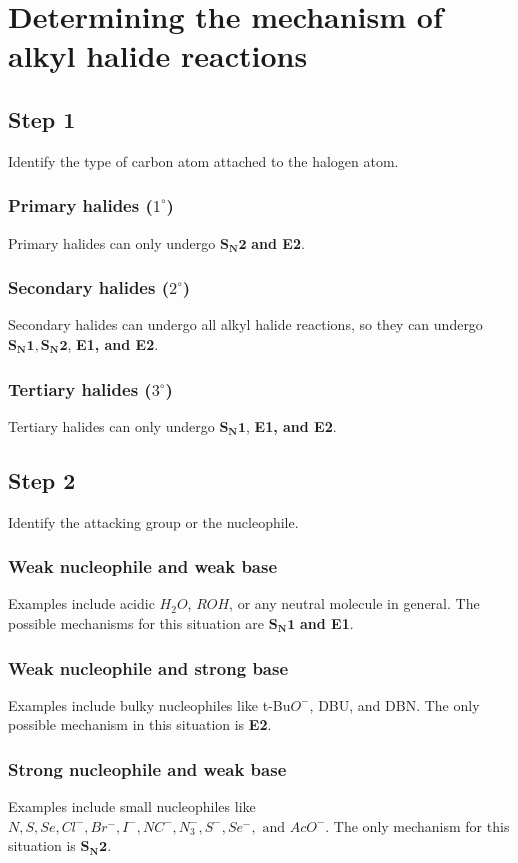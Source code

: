 \documentclass[11pt]{article}
\begin{document}
\newpage
\section{Determining the mechanism of alkyl halide reactions}
\label{sec:orge17bf5c}

\subsection{Step 1}
\label{sec:orgf35dc23}
Identify the type of carbon atom attached to the halogen atom.
\subsubsection{Primary halides (\(1^{\circ}\))}
\label{sec:orge9f49a9}
Primary halides can only undergo \(\boldsymbol{S_N 2}\) \textbf{and E2}.
\subsubsection{Secondary halides (\(2^{\circ}\))}
\label{sec:orga2431b0}
Secondary halides can undergo all alkyl halide reactions, so they can undergo \(\boldsymbol{S_N 1, S_N 2}\), \textbf{E1, and E2}.
\subsubsection{Tertiary halides (\(3^{\circ}\))}
\label{sec:orga6bf964}
Tertiary halides can only undergo \(\boldsymbol{S_N 1}\), \textbf{E1, and E2}.
\subsection{Step 2}
\label{sec:org70448bf}
Identify the attacking group or the nucleophile.
\subsubsection{Weak nucleophile and weak base}
\label{sec:orgb19e591}
Examples include acidic \(H_2 O\), \(ROH\), or any neutral molecule in general. The possible mechanisms for this situation are \(\boldsymbol{S_N 1}\) \textbf{and E1}.
\subsubsection{Weak nucleophile and strong base}
\label{sec:orgeb1d4f6}
Examples include bulky nucleophiles like t-Bu\(O^-\), DBU, and DBN. The only possible mechanism in this situation is \textbf{E2}.
\subsubsection{Strong nucleophile and weak base}
\label{sec:org110a512}
Examples include small nucleophiles like \(N, S, Se, Cl^-, Br^-, I^-, NC^-, N_3^-, S^-, Se^-, \text{ and } AcO^-\). The only mechanism for this situation is \(\boldsymbol{S_N 2}\).
\end{document}
